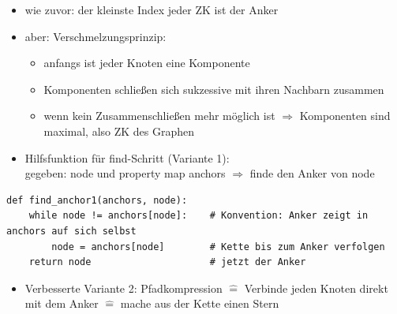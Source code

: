 \documentclass[11pt, fleqn]{scrreprt}
\begin{document}
            \begin{itemize}
                \item wie zuvor: der kleinste Index jeder ZK ist der Anker
                \item aber: Verschmelzungsprinzip:
                \begin{itemize}
                    \item anfangs ist jeder Knoten eine Komponente
                    \item Komponenten schließen sich sukzessive mit ihren Nachbarn zusammen
                    \item wenn kein Zusammenschließen mehr möglich ist $\Rightarrow$ Komponenten sind maximal, also ZK des Graphen
                \end{itemize}
                \item Hilfsfunktion für find-Schritt (Variante 1): \\
                gegeben: node und property map anchors $\Rightarrow$ finde den Anker von node
            \end{itemize}

            \begin{verbatim}
def find_anchor1(anchors, node):
    while node != anchors[node]:    # Konvention: Anker zeigt in anchors auf sich selbst
        node = anchors[node]        # Kette bis zum Anker verfolgen
    return node                     # jetzt der Anker
            \end{verbatim}

            \begin{itemize}
                \item Verbesserte Variante 2: Pfadkompression $\widehat{=}$ Verbinde jeden Knoten direkt mit dem Anker $\widehat{=}$ mache aus der Kette einen Stern
            \end{itemize}
\end{document}
